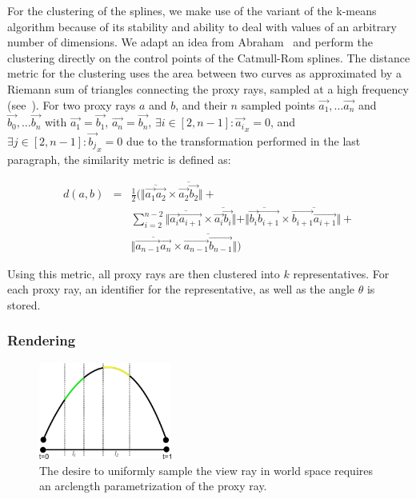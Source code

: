 For the clustering of the splines, we make use of the variant of the k-means~\cite{hartigan75kmeans} algorithm because of its stability and ability to deal with values of an arbitrary number of dimensions.  We adapt an idea from Abraham~\etal \cite{abraham03clustering} and perform the clustering directly on the control points of the Catmull-Rom splines.  The distance metric for the clustering uses the area between two curves as approximated by a Riemann sum of triangles connecting the proxy rays, sampled at a high frequency (see~).  For two proxy rays $a$ and $b$, and their $n$ sampled points $\vec{a_1}, \dots \vec{a_n}$ and $\vec{b_0}, \dots \vec{b_n}$ with $\vec{a_1} = \vec{b_1}$, $\vec{a_n} = \vec{b_n}$, $\exists i\in[2, n-1] : \vec{a_i}_x = 0$, and $\exists j\in[2, n-1] : \vec{b_j}_x = 0$ due to the transformation performed in the last paragraph, the similarity metric is defined as:

\begin{eqnarray}
d(a,b) &=& \frac{1}{2} \Big( \Vert \overline{\vec{a_1}\vec{a_2}} \times \overline{\vec{a_2}\vec{b_2}}\Vert + \nonumber \\
&& \sum_{i=2}^{n-2}\Vert \overline{\vec{a_i}\vec{a_{i+1}}} \times \overline{\vec{a_i}\vec{b_i}} \Vert + \Vert \overline{\vec{b_i}\vec{b_{i+1}}} \times \overline{\vec{b_{i+1}}\vec{a_{i+1}}}\Vert + \\
&& \Vert \overline{\vec{a_{n-1}}\vec{a_n}} \times \overline{\vec{a_{n-1}}\vec{b_{n-1}}}\Vert \Big) \nonumber 
\end{eqnarray}

Using this metric, all proxy rays are then clustered into $k$ representatives.  For each proxy ray, an identifier for the representative, as well as the angle $\theta$ is stored.



\subsubsection{Rendering} \label{contributions:fem:rendering}
\begin{figure}
\centering
\includegraphics[width=0.39\textwidth]{figures/contributions/fem/arclength.pdf}
\caption{The desire to uniformly sample the view ray in world space requires an arclength parametrization of the proxy ray.}
\label{contributions:fem:arclength}
\end{figure}

